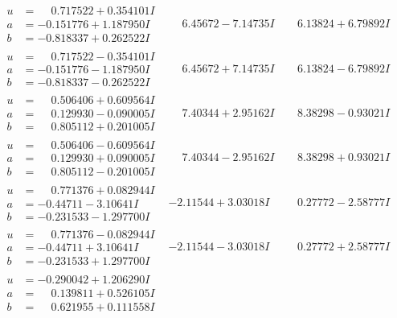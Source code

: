 \documentclass[1p]{elsarticle_modified}
\theoremstyle{definition}
\begin{document}
$$\begin{array}{c|c|c}
\begin{aligned}
u &= \phantom{-}0.717522 + 0.354101 I \\
a &= -0.151776 + 1.187950 I \\
b &= -0.818337 + 0.262522 I\end{aligned}
 & \phantom{-}6.45672 - 7.14735 I & \phantom{-}6.13824 + 6.79892 I \\ \hline\begin{aligned}
u &= \phantom{-}0.717522 - 0.354101 I \\
a &= -0.151776 - 1.187950 I \\
b &= -0.818337 - 0.262522 I\end{aligned}
 & \phantom{-}6.45672 + 7.14735 I & \phantom{-}6.13824 - 6.79892 I \\ \hline\begin{aligned}
u &= \phantom{-}0.506406 + 0.609564 I \\
a &= \phantom{-}0.129930 - 0.090005 I \\
b &= \phantom{-}0.805112 + 0.201005 I\end{aligned}
 & \phantom{-}7.40344 + 2.95162 I & \phantom{-}8.38298 - 0.93021 I \\ \hline\begin{aligned}
u &= \phantom{-}0.506406 - 0.609564 I \\
a &= \phantom{-}0.129930 + 0.090005 I \\
b &= \phantom{-}0.805112 - 0.201005 I\end{aligned}
 & \phantom{-}7.40344 - 2.95162 I & \phantom{-}8.38298 + 0.93021 I \\ \hline\begin{aligned}
u &= \phantom{-}0.771376 + 0.082944 I \\
a &= -0.44711 - 3.10641 I \\
b &= -0.231533 - 1.297700 I\end{aligned}
 & -2.11544 + 3.03018 I & \phantom{-}0.27772 - 2.58777 I \\ \hline\begin{aligned}
u &= \phantom{-}0.771376 - 0.082944 I \\
a &= -0.44711 + 3.10641 I \\
b &= -0.231533 + 1.297700 I\end{aligned}
 & -2.11544 - 3.03018 I & \phantom{-}0.27772 + 2.58777 I \\ \hline\begin{aligned}
u &= -0.290042 + 1.206290 I \\
a &= \phantom{-}0.139811 + 0.526105 I \\
b &= \phantom{-}0.621955 + 0.111558 I\end{aligned}

\end{array}$$
\end{document}
